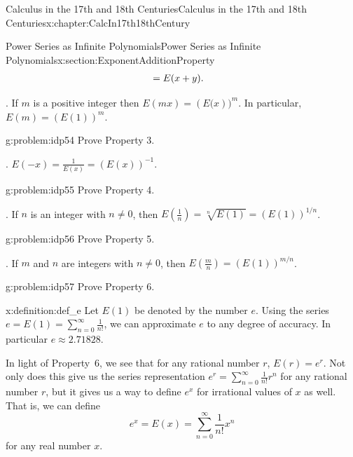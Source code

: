 \begin{chapterptx}{Calculus in the 17th and 18th Centuries}{}{Calculus in the 17th and 18th Centuries}{}{}{x:chapter:CalcIn17th18thCentury}
\begin{sectionptx}{Power Series as Infinite Polynomials}{}{Power Series as Infinite Polynomials}{}{}{x:section:ExponentAdditionProperty}
\begin{align}
			& =E(x+y)\text{.}\label{x:mrow:eq_ExponentAdditionProperty}
		\end{align}
		\par
		 . If \(m\) is a positive integer then \(E(mx)=\left(E(x\right))^m\). In particular, \(E(m)=\left(E(1)\right)^m\).%
		\begin{problem}{}{g:problem:idp54}%
			 Prove Property 3.%
		\end{problem}
		. \(E(-x)=\frac{1}{E(x)}=\left(E(x)\right)^{-1}\).%
		\begin{problem}{}{g:problem:idp55}%
			 Prove Property 4.%
		\end{problem}
		. If \(n\) is an integer with \(n\neq 0\), then \(E(\frac{1}{n})=\sqrt[n]{E(1)}=\left(E(1)\right)^{1/n}\).%
		\begin{problem}{}{g:problem:idp56}%
			 Prove Property 5.%
		\end{problem}
		. If \(m\) and \(n\) are integers with \(n\neq 0\), then \(E\left(\frac{m}{n}\right)=\left(E(1)\right)^{m/n}\).%
		\begin{problem}{}{g:problem:idp57}%
			 Prove Property 6.%
		\end{problem}
		\begin{definition}{}{x:definition:def_e}%
			 Let \(E(1)\) be denoted by the number \(e\). Using the series \(e=E(1)=\sum_{n=0}^\infty\frac{1}{n!}\), we can approximate \(e\) to any degree of accuracy. In particular \(e\approx 2.71828\).%
		\end{definition}
		In light of Property~6, we see that for any rational number \(r\), \(E(r)=e^r\). Not only does this give us the series representation \(e^r=\sum_{n=0}^\infty\frac{1}{n!}r^n\) for any rational number \(r\), but it gives us a way to define \(e^x\) for irrational values of \(x\) as well. That is, we can define%
		\begin{equation*}
			e^x=E(x)=\sum_{n=0}^\infty\frac{1}{n!}x^n
		\end{equation*}
		for any real number \(x\).%
		\par

\end{sectionptx}
\end{chapterptx}
